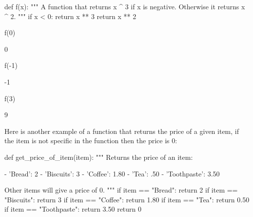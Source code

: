 \begin{pyin}
def f(x):
    """
    A function that returns x ^ 3 if x is negative.
    Otherwise it returns x ^ 2.
    """
    if x < 0:
        return x ** 3
    return x ** 2
\end{pyin}







\begin{pyin}
f(0)
\end{pyin}





\begin{raw}
0
\end{raw}







\begin{pyin}
f(-1)
\end{pyin}





\begin{raw}
-1
\end{raw}







\begin{pyin}
f(3)
\end{pyin}





\begin{raw}
9
\end{raw}





Here is another example of a function that returns the price of a given item, if
the item is not specific in the function then the price is 0:




\begin{pyin}
def get_price_of_item(item):
    """
    Returns the price of an item:

    - 'Bread': 2
    - 'Biscuits': 3
    - 'Coffee': 1.80
    - 'Tea': .50
    - 'Toothpaste': 3.50

    Other items will give a price of 0.
    """
    if item == "Bread":
        return 2
    if item == "Biscuits":
        return 3
    if item == "Coffee":
        return 1.80
    if item == "Tea":
        return 0.50
    if item == "Toothpaste":
        return 3.50
    return 0
\end{pyin}







